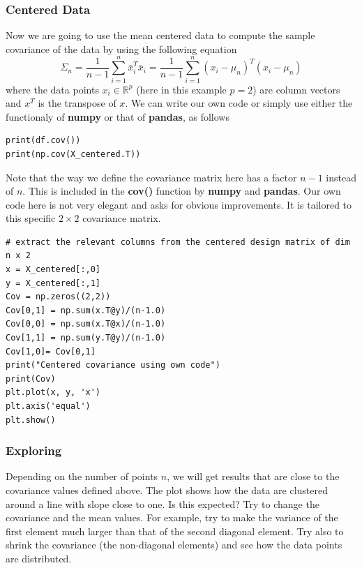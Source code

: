 \documentclass{beamer}
\begin{document}
\begin{frame}
\frametitle{Centered Data}

Now we are going to use the mean centered data to compute the sample covariance of the data by using the following equation
\begin{equation*}
\Sigma_n = \frac{1}{n-1} \sum_{i=1}^n \bar{x}_i^T \bar{x}_i = \frac{1}{n-1} \sum_{i=1}^n (x_i - \mu_n)^T (x_i - \mu_n)
\end{equation*}
where the data points $x_i \in \mathbb{R}^p$ (here in this example $p = 2$) are column vectors and $x^T$ is the transpose of $x$.
We can write our own code or simply use either the functionaly of \textbf{numpy} or that of \textbf{pandas}, as follows



\begin{verbatim}
print(df.cov())
print(np.cov(X_centered.T))

\end{verbatim}

Note that the way we define the covariance matrix here has a factor $n-1$ instead of $n$. This is included in the \textbf{cov()} function by \textbf{numpy} and \textbf{pandas}. 
Our own code here is not very elegant and asks for obvious improvements. It is tailored to this specific $2\times 2$ covariance matrix. 














\begin{verbatim}
# extract the relevant columns from the centered design matrix of dim n x 2
x = X_centered[:,0]
y = X_centered[:,1]
Cov = np.zeros((2,2))
Cov[0,1] = np.sum(x.T@y)/(n-1.0)
Cov[0,0] = np.sum(x.T@x)/(n-1.0)
Cov[1,1] = np.sum(y.T@y)/(n-1.0)
Cov[1,0]= Cov[0,1]
print("Centered covariance using own code")
print(Cov)
plt.plot(x, y, 'x')
plt.axis('equal')
plt.show()

\end{verbatim}
\end{frame}

\begin{frame}
\frametitle{Exploring}

Depending on the number of points $n$, we will get results that are close to the covariance values defined above.
The plot shows how the data are clustered around a line with slope close to one. Is this expected?  Try to change the covariance and the mean values. For example, try to make the variance of the first element much larger than that of the second diagonal element. Try also to shrink the covariance  (the non-diagonal elements) and see how the data points are distributed.
\end{frame}
\end{document}
